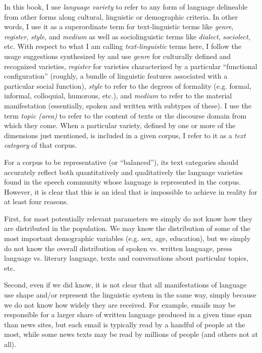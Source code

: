 In this book, I use \textit{language variety}  to refer to any form of language delineable from other forms along cultural, linguistic or demographic criteria. In other words, I use it as a superordinate term for text\hyp{}linguistic terms like \textit{genre},  \textit{register},  \textit{style},  and \textit{medium} as well as sociolinguistic  terms like \textit{dialect}, \textit{sociolect}, etc. With respect to what I am calling \textit{text\hyp{}linguistic} terms here, I follow the usage suggestions synthesized by \citet{lee_genres_2001} and use \textit{genre} for culturally defined and recognized varieties,  \textit{register}  for varieties characterized by a particular ``functional configuration'' (roughly, a bundle of linguistic features associated with a particular social function), \textit{style}  to refer to the degrees of formality (e.g. formal, informal, colloquial, humorous, etc.), and \textit{medium} to refer to the material manifestation (essentially, spoken and written with subtypes of these). I use the term \textit{topic (area)} to refer to the content of texts or the discourse domain from which they come. When a particular variety,  defined by one or more of the dimensions just mentioned, is included in a given corpus, I refer to it as a \textit{text category} of that corpus.

For a corpus to be representative (or ``balanced''),  its text categories should accurately reflect both quantitatively and qualitatively the language varieties  found in the speech community whose language is represented in the corpus. However, it is clear that this is an ideal that is impossible to achieve in reality for at least four reasons.

First, for most potentially relevant parameters we simply do not know how they are distributed in the population. We may know the distribution of some of the most important demographic  variables (e.g. sex, age,  education), but we simply do not know the overall distribution of spoken  vs. written language, press language vs. literary  language, texts and conversations  about particular topics, etc.

Second, even if we did know, it is not clear that all manifestations of language use shape and\slash or represent the linguistic system in the same way, simply because we do not know how widely they are received. For example, emails may be responsible for a larger share of written  language produced in a given time span than news  sites, but each email is typically read by a handful of people at the most, while some news texts may be read by millions of people (and others not at all).

